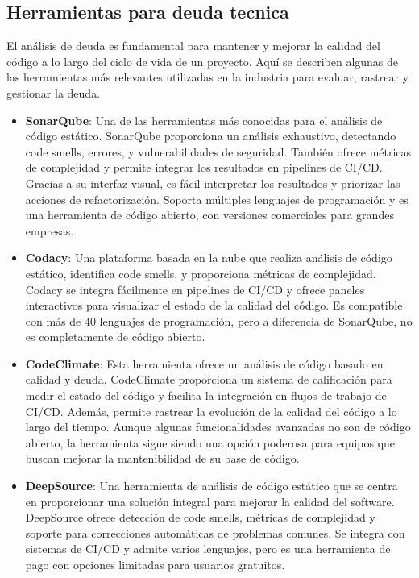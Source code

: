 \subsection{Herramientas para deuda tecnica}
El análisis de \gls{deuda} es fundamental para mantener y mejorar la calidad del código a lo largo del ciclo de vida de un proyecto. Aquí se describen algunas de las herramientas más relevantes utilizadas en la industria para evaluar, rastrear y gestionar la \gls{deuda}.
\begin{itemize}
    \item \textbf{SonarQube}: Una de las herramientas más conocidas para el análisis de código estático. SonarQube proporciona un análisis exhaustivo, detectando code smells, errores, y vulnerabilidades de seguridad. También ofrece métricas de complejidad y permite integrar los resultados en pipelines de CI/CD. Gracias a su interfaz visual, es fácil interpretar los resultados y priorizar las acciones de refactorización. Soporta múltiples lenguajes de programación y es una herramienta de código abierto, con versiones comerciales para grandes empresas.
    \item \textbf{Codacy}: Una plataforma basada en la nube que realiza análisis de código estático, identifica code smells, y proporciona métricas de complejidad. Codacy se integra fácilmente en pipelines de CI/CD y ofrece paneles interactivos para visualizar el estado de la calidad del código. Es compatible con más de 40 lenguajes de programación, pero a diferencia de SonarQube, no es completamente de código abierto.
    \item \textbf{CodeClimate}: Esta herramienta ofrece un análisis de código basado en calidad y \gls{deuda}. CodeClimate proporciona un sistema de calificación para medir el estado del código y facilita la integración en flujos de trabajo de CI/CD. Además, permite rastrear la evolución de la calidad del código a lo largo del tiempo. Aunque algunas funcionalidades avanzadas no son de código abierto, la herramienta sigue siendo una opción poderosa para equipos que buscan mejorar la mantenibilidad de su base de código.
    \item \textbf{DeepSource}: Una herramienta de análisis de código estático que se centra en proporcionar una solución integral para mejorar la calidad del software. DeepSource ofrece detección de code smells, métricas de complejidad y soporte para correcciones automáticas de problemas comunes. Se integra con sistemas de CI/CD y admite varios lenguajes, pero es una herramienta de pago con opciones limitadas para usuarios gratuitos.

\end{itemize}
